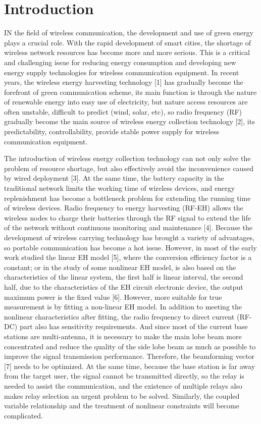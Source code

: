 \documentclass[conference]{IEEEtran}
\begin{document}
\section{Introduction}
\lettrine[lines=2]{I}{}N the field of wireless communication, the development and use of green energy plays a crucial role. With the rapid development of smart cities, the shortage of wireless network resources has become more and more serious. This is a critical and challenging issue for reducing energy consumption and developing new energy supply technologies for wireless communication equipment. In recent years, the wireless energy harvesting technology [1] has gradually become the forefront of green communication scheme, its main function is through the nature of renewable energy into easy use of electricity, but nature access resources are often unstable, difficult to predict (wind, solar, etc), so radio frequency (RF) gradually become the main source of wireless energy collection technology [2], its predictability, controllability, provide stable power supply for wireless communication equipment.

The introduction of wireless energy collection technology can not only solve the problem of resource shortage, but also effectively avoid the inconvenience caused by wired deployment [3]. At the same time, the battery capacity in the traditional network limits the working time of wireless devices, and energy replenishment has become a bottleneck problem for extending the running time of wireless devices. Radio frequency to energy harvesting (RF-EH) allows the wireless nodes to charge their batteries through the RF signal to extend the life of the network without continuous monitoring and maintenance [4].
Because the development of wireless carrying technology has brought a variety of advantages, so portable communication has become a hot issue. 
However, in most of the early work studied the linear EH model [5], where the conversion efficiency factor is a constant; or in the study of some nonlinear EH model, is also based on the characteristics of the linear system, the first half is linear interval, the second half, due to the characteristics of the EH circuit electronic device, the output maximum power is the fixed value [6]. However, more suitable for true measurement is by fitting a non-linear EH model. 
In addition to meeting the nonlinear characteristics after fitting, the radio frequency to direct current (RF-DC) part also has sensitivity requirements.
And since most of the current base stations are multi-antenna, it is necessary to make the main lobe beam more concentrated and reduce the quality of the side lobe beam as much as possible to improve the signal transmission performance. Therefore, the beamforming vector [7] needs to be optimized.
At the same time, because the base station is far away from the target user, the signal cannot be transmitted directly, so the relay is needed to assist the communication, and the existence of multiple relays also makes relay selection an urgent problem to be solved.
Similarly, the coupled variable relationship and the treatment of nonlinear constraints will become complicated.
\end{document}
